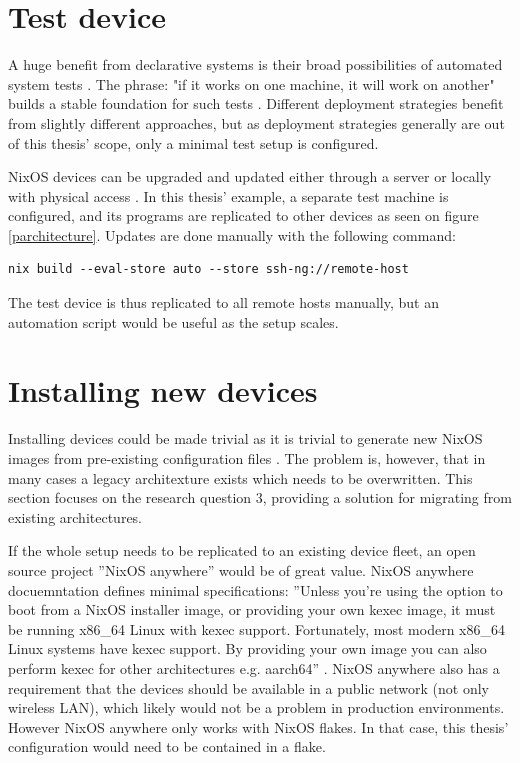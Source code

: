 \section{Test device}

A huge benefit from declarative systems is their broad possibilities
of automated system tests \cite{van2010automating}. The phrase: "if it
works on one machine, it will work on another" builds a stable
foundation for such tests \cite{nixosNixOSManual}. Different
deployment strategies benefit from slightly different approaches, but
as deployment strategies generally are out of this thesis' scope, only
a minimal test setup is configured.

NixOS devices can be upgraded and updated either through a server or locally
with physical access \cite{nixosNixOSManual}. In this thesis' example,
a separate test machine is configured, and its programs are
replicated to other devices as seen on figure
\ref{parchitecture}. Updates are done manually with the following command:

\begin{lstlisting}
nix build --eval-store auto --store ssh-ng://remote-host
\end{lstlisting}

The test device is thus replicated to all remote hosts manually, but
an automation script would be useful as the setup scales.

\section{Installing new devices} \label{instnewdevices}

Installing devices could be made trivial as it is trivial to generate new
NixOS images from pre-existing configuration files
\cite{nixosNixOSManual}. The problem is, however, that in many cases a
legacy architexture exists which needs to be overwritten. This
section focuses on the research question 3, providing a solution for
migrating from existing architectures.

If the whole setup needs to be replicated to an existing device fleet,
an open source project ''NixOS anywhere'' would be of great value. NixOS
anywhere docuemntation defines minimal specifications: ''Unless you're using the
option to boot from a NixOS installer image, or providing your own
kexec image, it must be running x86\_64 Linux with kexec
support. Fortunately, most modern x86\_64 Linux systems have kexec
support. By providing your own image you can also perform kexec for
other architectures e.g. aarch64'' \cite{githubGitHubNixcommunitynixosanywhere}. NixOS anywhere also has a
requirement that the devices should be available in a public network
(not only wireless LAN), which likely would not be a problem in
production environments. However NixOS anywhere  only works with NixOS
flakes. In that case, this thesis' configuration would need to be contained in a
flake. 

